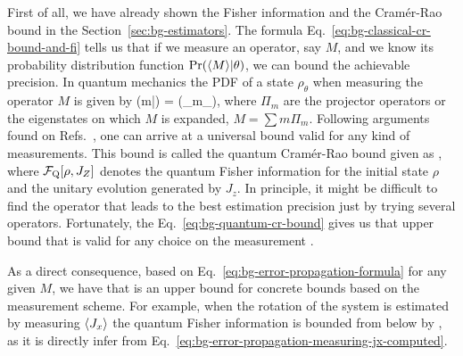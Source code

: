 First of all, we have already shown the Fisher information and the Cram\'er-Rao bound in the Section~\ref{sec:bg-estimators}.
The formula Eq.~\eqref{eq:bg-classical-cr-bound-and-fi} tells us that if we measure an operator, say $M$, and we know its probability distribution function $\text{Pr}(\langle{M}\rangle|\theta)$, we can bound the achievable precision.
In quantum mechanics the PDF of a state $\rho_\theta$ when measuring the operator $M$ is given by
\be
  \prob(m|\theta) = \tr({\Pi_{m}\rho_\theta}),
\ee
where $\Pi_{m}$ are the projector operators or the eigenstates on which $M$ is expanded, $M = \sum m \Pi_m$.
Following arguments found on Refs.~\cite{Giovannetti2004, Paris2009}, one can arrive at a universal bound valid for any kind of measurements.
This bound is called the quantum Cram\'er-Rao bound given as
\be
  \label{eq:bg-quantum-cr-bound}
  \varinv{\theta} \leqslant {},
\ee
where $\mathcal{F}_{\textnormal{Q}}[{\textstyle \rho, J_Z}]$ denotes the quantum Fisher information for the initial state $\rho$ and the unitary evolution generated by $J_z$.
In principle, it might be difficult to find the operator that leads to the best estimation precision just by trying several operators.
Fortunately, the Eq.~\eqref{eq:bg-quantum-cr-bound} gives us that upper bound that is valid for any choice on the measurement \cite{Helstrom1976, Holevo1982}.

As a direct consequence, based on Eq.~\eqref{eq:bg-error-propagation-formula} for any given $M$, we have that
\be
   \geqslant {}
\ee
is an upper bound for concrete bounds based on the measurement scheme.
For example, when the rotation of the system is estimated by measuring $\langle{J_x}\rangle$ the quantum Fisher information is bounded from below by \cite{Pezze2009}
\be
  \label{eq:bg-pezze-bound}
   \geqslant {},
\ee
as it is directly infer from Eq.~\eqref{eq:bg-error-propagation-measuring-jx-computed}.

